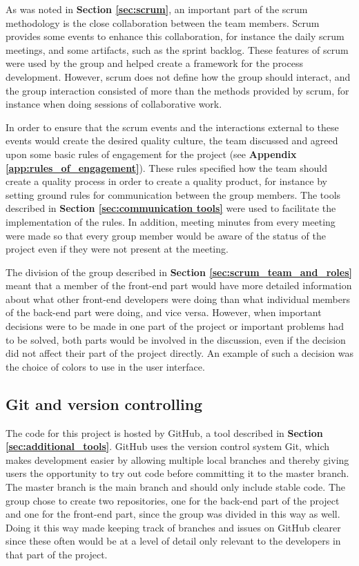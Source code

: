 As was noted in \textbf{Section \ref{sec:scrum}}, an important part of the scrum methodology is the close collaboration between the team members. Scrum provides some events to enhance this collaboration, for instance the daily scrum meetings, and some artifacts, such as the sprint backlog. These features of scrum were used by the group and helped create a framework for the process development. However, scrum does not define how the group should interact, and the group interaction consisted of more than the methods provided by scrum, for instance when doing sessions of collaborative work.\newline

In order to ensure that the scrum events and the interactions external to these events would create the desired quality culture, the team discussed and agreed upon some basic rules of engagement for the project (see \textbf{Appendix \ref{app:rules_of_engagement}}). These rules specified how the team should create a quality process in order to create a quality product, for instance by setting ground rules for communication between the group members. The tools described in \textbf{Section \ref{sec:communication tools}} were used to facilitate the implementation of the rules. In addition, meeting minutes from every meeting were made so that every group member would be aware of the status of the project even if they were not present at the meeting.\newline

The division of the group described in \textbf{Section \ref{sec:scrum_team_and_roles}} meant that a member of the front-end part would have more detailed information about what other front-end developers were doing than what individual members of the back-end part were doing, and vice versa. However, when important decisions were to be made in one part of the project or important problems had to be solved, both parts would be involved in the discussion, even if the decision did not affect their part of the project directly. An example of such a decision was the choice of colors to use in the user interface.

\subsection{Git and version controlling}

The code for this project is hosted by GitHub, a tool described in \textbf{Section \ref{sec:additional_tools}}. GitHub uses the version control system Git, which makes development easier by allowing multiple local branches and thereby giving users the opportunity to try out code before committing it to the master branch. The master branch is the main branch and should only include stable code. The group chose to create two repositories, one for the back-end part of the project and one for the front-end part, since the group was divided in this way as well. Doing it this way made keeping track of branches and issues on GitHub clearer since these often would be at a level of detail only relevant to the developers in that part of the project. 

